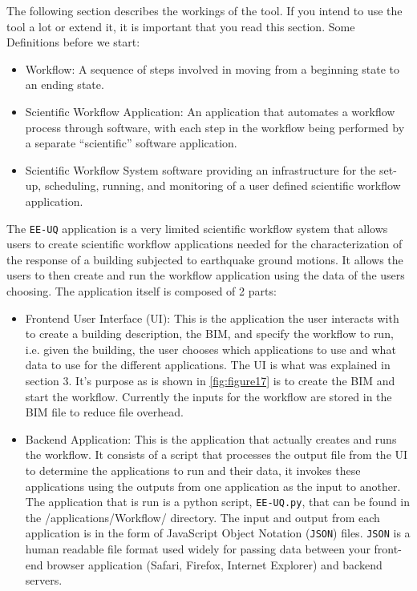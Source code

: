The following section describes the workings of the tool. If you
intend to use the tool a lot or extend it, it is important that you
read this section.  Some Definitions before we start:
\begin{itemize}
\item Workflow: A sequence of steps involved in moving from a
  beginning state to an ending state.
\item Scientific Workflow Application: An application that automates a
  workflow process through software, with each step in the workflow
  being performed by a separate “scientific” software application.
\item Scientific Workflow System software providing an infrastructure
  for the set-up, scheduling, running, and monitoring of a user
  defined scientific workflow application.
\end{itemize}

The \texttt{EE-UQ} application is a very limited scientific workflow system
that allows users to create scientific workflow applications needed
for the characterization of the response of a building subjected to
earthquake ground motions. It allows the users to then create and run
the workflow application using the data of the users choosing. The
application itself is composed of 2 parts:

\begin{itemize}
\item Frontend User Interface (UI): This is the application the user
  interacts with to create a building description, the BIM, and
  specify the workflow to run, i.e. given the building, the user
  chooses which applications to use and what data to use for the
  different applications.  The UI is what was explained in section
  3. It’s purpose as is shown in \autoref{fig:figure17} is to create
  the BIM and start the workflow.  Currently the inputs for the
  workflow are stored in the BIM file to reduce file overhead.
\item Backend Application: This is the application that actually
  creates and runs the workflow. It consists of a script that
  processes the output file from the UI to determine the applications
  to run and their data, it invokes these applications using the
  outputs from one application as the input to another. The
  application that is run is a python script, \texttt{EE-UQ.py}, that can be
  found in the /applications/Workflow/ directory.  The input and
  output from each application is in the form of JavaScript Object
  Notation (\texttt{JSON}) files. \texttt{JSON} is a human readable file format used
  widely for passing data between your front-end browser application
  (Safari, Firefox, Internet Explorer) and backend servers.
\end{itemize}



